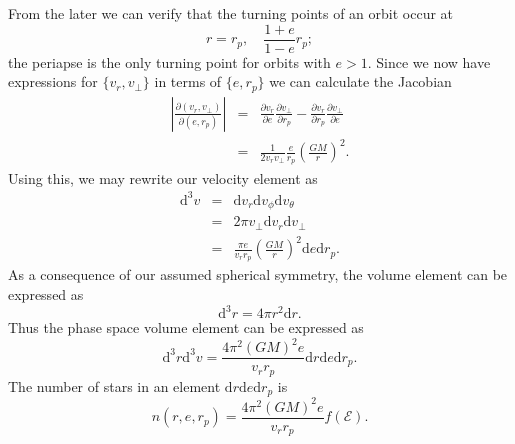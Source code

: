 \documentclass[useAMS,usedcolumn,usegraphicx,usenatbib]{mn2e}
\newcommand{\dd}{\ensuremath{\mathrm{d}}}
\newcommand{\partialdiff}[2]{\ensuremath{\frac{\partial {#1}}{\partial {#2}}}}
\newcommand{\recip}[1]{\ensuremath{\frac{1}{#1}}}
\begin{document}
From the later we can verify that the turning points of an orbit occur at
\begin{equation}
r = r_p,\quad \frac{1+e}{1-e}r_p;
\end{equation}
the periapse is the only turning point for orbits with $e > 1$. Since we now have expressions for $\{v_r, v_\perp\}$ in terms of $\{e, r_p\}$ we can calculate the Jacobian
\begin{eqnarray}
\left|\frac{\partial(v_r, v_\perp)}{\partial(e, r_p)}\right| & = & \partialdiff{v_r}{e}\partialdiff{v_\perp}{r_p} - \partialdiff{v_r}{r_p}\partialdiff{v_\perp}{e} \\
 & = & \recip{2v_rv_\perp}\frac{e}{r_p}\left(\frac{GM}{r}\right)^2.
\end{eqnarray}
Using this, we may rewrite our velocity element as
\begin{eqnarray}
\dd^3v & = & \dd v_r \dd v_\phi \dd v_\theta\\
 & = & 2\pi v_\perp \dd v_r \dd v_\perp\\
 & = & \frac{\pi e}{v_rr_p}\left(\frac{GM}{r}\right)^2\dd e \dd r_p.
\end{eqnarray}
As a consequence of our assumed spherical symmetry, the volume element can be expressed as
\begin{equation}
\dd^3r = 4\pi r^2 \dd r.
\end{equation}
Thus the phase space volume element can be expressed as
\begin{equation}
\dd^3r\dd^3v = \frac{4\pi^2(GM)^2e}{v_rr_p}\dd r\dd e \dd r_p.
\end{equation}
The number of stars in an element $\dd r\dd e \dd r_p$ is
\begin{equation}
n(r, e, r_p) = \frac{4\pi^2(GM)^2e}{v_rr_p}f(\mathcal{E}).
\end{equation}
\end{document}
